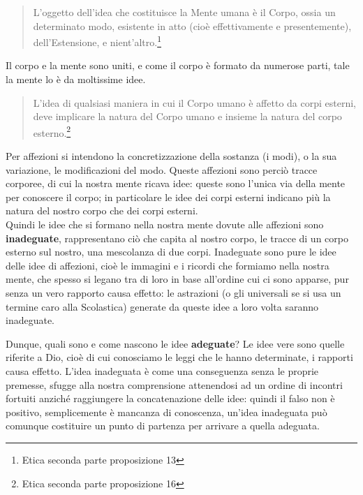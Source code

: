\begin{quotation}
	\small L’oggetto dell’idea che costituisce la Mente umana è il Corpo, ossia un determinato modo, esistente in atto (cioè effettivamente e presentemente), dell’Estensione, e nient’altro.\footnote{Etica seconda parte proposizione 13}
\end{quotation}

Il corpo e la mente sono uniti, e come il corpo è formato da numerose parti, tale la mente lo è da moltissime idee.
\begin{quotation}
	\small L’idea di qualsiasi maniera in cui il Corpo umano è affetto da corpi esterni, deve implicare la natura del Corpo umano e insieme la natura del corpo esterno.\footnote{Etica seconda parte proposizione 16}
\end{quotation}

Per affezioni si intendono la concretizzazione della sostanza (i modi), o la sua variazione, le modificazioni del modo. Queste affezioni sono perciò tracce corporee, di cui la nostra mente ricava idee: queste sono l'unica via della mente per conoscere il corpo; in particolare le idee dei corpi esterni indicano più la natura del nostro corpo che dei corpi esterni.\\
Quindi le idee che si formano nella nostra mente dovute alle affezioni sono \textbf{inadeguate}, rappresentano ciò che capita al nostro corpo, le tracce di un corpo esterno sul nostro, una mescolanza di due corpi. Inadeguate sono pure le idee delle idee di affezioni, cioè le immagini e i ricordi che formiamo nella nostra mente, che spesso si legano tra di loro in base all'ordine cui ci sono apparse, pur senza un vero rapporto causa effetto: le astrazioni (o gli universali se si usa un termine caro alla Scolastica) generate da queste idee a loro volta saranno inadeguate.

Dunque, quali sono e come nascono le idee \textbf{adeguate}? Le idee vere sono quelle riferite a Dio, cioè di cui conosciamo le leggi che le hanno determinate, i rapporti causa effetto. L'idea inadeguata è come una conseguenza senza le proprie premesse, sfugge alla nostra comprensione attenendosi ad un ordine di incontri fortuiti anziché raggiungere la concatenazione delle idee: quindi il falso non è positivo, semplicemente è mancanza di conoscenza, un'idea inadeguata può comunque costituire un punto di partenza per arrivare a quella adeguata.